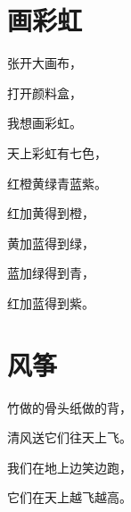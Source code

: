 \documentclass[12pt,UTF-8,openany]{ctexbook}
\begin{document}
\chapter{画彩虹}

\begin{large}
    
    张开大画布，
    
    打开颜料盒，
    
    我想画彩虹。
    
    天上彩虹有七色，
    
    红橙黄绿青蓝紫。
    
    红加黄得到橙，
    
    黄加蓝得到绿，
    
    蓝加绿得到青，
    
    红加蓝得到紫。
    
\end{large}


\clearpage

\begin{center}
    
\end{center}


\hanzibox{}\hanzibox{}\hanzibox{}\hanzibox{}\hspace{1em}\hanzibox{}\hanzibox{}\hanzibox{}\hanzibox{}

\hanzibox{}\hanzibox{}\hanzibox{}\hanzibox{}\hspace{1em}\hanzibox{}\hanzibox{}\hanzibox{}\hanzibox{}

\hanzibox{}\hanzibox{}\hanzibox{}\hanzibox{}\hspace{1em}\hanzibox{}\hanzibox{}\hanzibox{}\hanzibox{}






\chapter{风筝}

\begin{large}
    
    竹做的骨头纸做的背，
    
    清风送它们往天上飞。
    
    我们在地上边笑边跑，
    
    它们在天上越飞越高。
    
\end{large}
\end{document}

